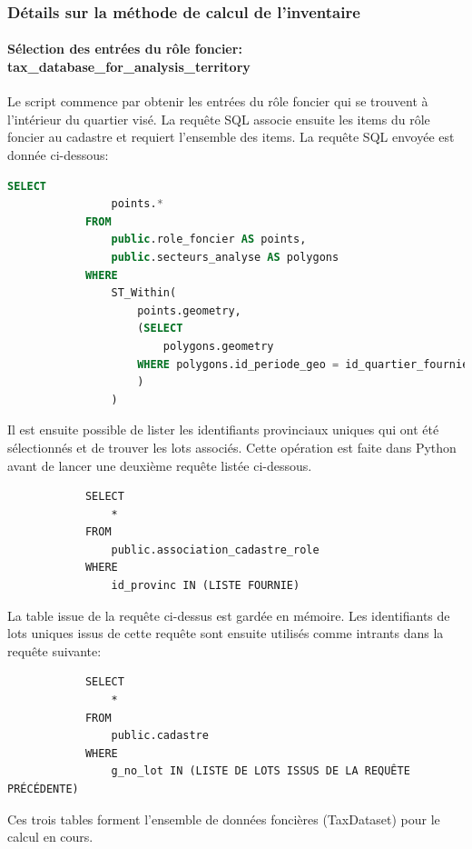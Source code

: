         \subsubsection{Détails sur la méthode de calcul de l'inventaire}
        
        \paragraph{Sélection des entrées du rôle foncier: tax\_database\_for\_analysis\_territory} Le script commence par obtenir les entrées du rôle foncier qui se trouvent à l'intérieur du quartier visé. La requête SQL associe ensuite les items du rôle foncier au cadastre et requiert l'ensemble des items. La requête SQL envoyée est donnée ci-dessous:
        \begin{lstlisting}[language=SQL, caption=Requête 1 dans tax\_database\_for\_analysis\_territory]
            SELECT 
                points.* 
            FROM 
                public.role_foncier AS points,
                public.secteurs_analyse AS polygons 
            WHERE 
                ST_Within(
                    points.geometry,
                    (SELECT 
                        polygons.geometry 
                    WHERE polygons.id_periode_geo = id_quartier_fournie
                    )
                )
        \end{lstlisting}
        Il est ensuite possible de lister les identifiants provinciaux uniques qui ont été sélectionnés et de trouver les lots associés. Cette opération est faite dans Python avant de lancer une deuxième requête listée ci-dessous.
        \begin{verbatim}
            SELECT 
                *
            FROM
                public.association_cadastre_role
            WHERE 
                id_provinc IN (LISTE FOURNIE)
        \end{verbatim}
        La table issue de la requête ci-dessus est gardée en mémoire. Les identifiants de lots uniques issus de cette requête sont ensuite utilisés comme intrants dans la requête suivante:
        \begin{verbatim}
            SELECT 
                * 
            FROM 
                public.cadastre
            WHERE 
                g_no_lot IN (LISTE DE LOTS ISSUS DE LA REQUÊTE PRÉCÉDENTE)
        \end{verbatim}
        Ces trois tables forment l'ensemble de données foncières (TaxDataset) pour le calcul en cours.
